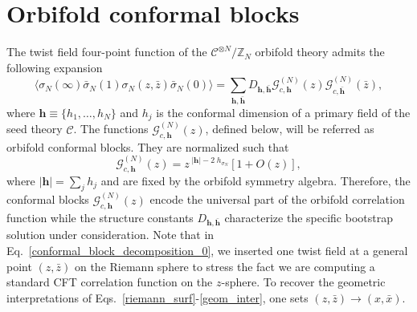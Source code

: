 \documentclass[a4paper,11pt]{article}
\begin{document}
\section{Orbifold conformal blocks}\label{sec:conf_blocks}
The twist field four-point function of the $\mathcal{C}^{\otimes N}/\mathbb{Z}_N$ orbifold 
theory admits the following expansion
\begin{equation}\label{conformal_block_decomposition_0}
 \langle \sigma_N (\infty)  \bar{\sigma}_N(1) \sigma_N (z, \bar{z})\bar{\sigma}_N(0)\rangle=
 \sum_{\boldsymbol{h},\boldsymbol{\bar{h}}} D_{\boldsymbol{h}, \boldsymbol{\bar{h}}}
 \mathcal{G}_{c, \boldsymbol{h}}^{(N)}(z)\mathcal{G}_{c,\boldsymbol{\bar{h}}}^{(N)}(\bar{z}),
\end{equation}
where $\boldsymbol{h}\equiv\{h_1, \dots, h_N\}$ and $h_j$ is the conformal dimension of  
a primary field of the seed theory $\mathcal{C}$. The functions $\mathcal{G}_{c, \boldsymbol{h}}^{(N)}(z)$, 
defined below, will be referred as orbifold conformal blocks. They are normalized such that
\begin{equation}
\label{G_asy}
\mathcal{G}_{c, \boldsymbol{h}}^{(N)}(z)=z^{\;|\boldsymbol{h}| -2\; h_{\sigma_N}}\left[1+ O(z)\right],
\end{equation}
where $|\boldsymbol{h}|=\sum_j h_j$ and are fixed by the orbifold symmetry algebra. Therefore, the conformal blocks $\mathcal{G}_{c, \boldsymbol{h}}^{(N)}(z)$ encode the universal part of the orbifold correlation function  while  the structure constants  $D_{\boldsymbol{h}, \boldsymbol{\bar{h}}}$  characterize the specific bootstrap solution under consideration. Note that in Eq.~\eqref{conformal_block_decomposition_0}, we inserted one twist field at a general point $(z,\bar{z})$ on the Riemann sphere to stress the fact we are computing a standard CFT correlation function on the $z$-sphere. To recover the geometric interpretations of Eqs.~\eqref{riemann_surf}-\eqref{geom_inter}, one sets $(z,\bar{z})\to (x,\bar{x})$.
\end{document}
